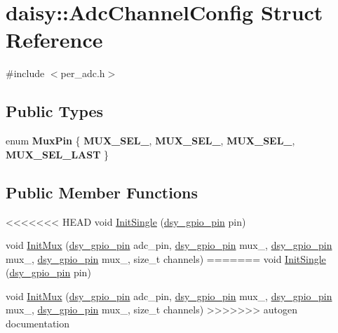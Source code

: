 \hypertarget{structdaisy_1_1_adc_channel_config}{}\section{daisy\+:\+:Adc\+Channel\+Config Struct Reference}
\label{structdaisy_1_1_adc_channel_config}


{\ttfamily \#include $<$per\+\_\+adc.\+h$>$}

\subsection*{Public Types}
\begin{DoxyCompactItemize}
\item 
\mbox{\label{structdaisy_1_1_adc_channel_config_af601e66da7eb60721792861fc91f2c83}} 
enum {\bfseries Mux\+Pin} \{ {\bfseries M\+U\+X\+\_\+\+S\+E\+L\+\_}, 
{\bfseries M\+U\+X\+\_\+\+S\+E\+L\+\_}, 
{\bfseries M\+U\+X\+\_\+\+S\+E\+L\+\_}, 
{\bfseries M\+U\+X\+\_\+\+S\+E\+L\+\_\+\+L\+A\+ST}
 \}
\end{DoxyCompactItemize}
\subsection*{Public Member Functions}
\begin{DoxyCompactItemize}
\item 
<<<<<<< HEAD
void \hyperlink{structdaisy_1_1_adc_channel_config_a53cd44a415eef197bc2f575f91d6d6af}{Init\+Single} (\hyperlink{structdsy__gpio__pin}{dsy\+\_\+gpio\+\_\+pin} pin)
\item 
void \hyperlink{structdaisy_1_1_adc_channel_config_a03a0b5bae339d3479e6b3d635d293c61}{Init\+Mux} (\hyperlink{structdsy__gpio__pin}{dsy\+\_\+gpio\+\_\+pin} adc\+\_\+pin, \hyperlink{structdsy__gpio__pin}{dsy\+\_\+gpio\+\_\+pin} mux\+\_, \hyperlink{structdsy__gpio__pin}{dsy\+\_\+gpio\+\_\+pin} mux\+\_, \hyperlink{structdsy__gpio__pin}{dsy\+\_\+gpio\+\_\+pin} mux\+\_, size\+\_\+t channels)
=======
void \hyperlink{structdaisy_1_1_adc_channel_config_a51189aad7fdee93523dfbcd333b681bf}{Init\+Single} (\hyperlink{structdsy__gpio__pin}{dsy\+\_\+gpio\+\_\+pin} pin)
\item 
void \hyperlink{structdaisy_1_1_adc_channel_config_ae825cc35459653136ccbf07d09c18fb9}{Init\+Mux} (\hyperlink{structdsy__gpio__pin}{dsy\+\_\+gpio\+\_\+pin} adc\+\_\+pin, \hyperlink{structdsy__gpio__pin}{dsy\+\_\+gpio\+\_\+pin} mux\+\_, \hyperlink{structdsy__gpio__pin}{dsy\+\_\+gpio\+\_\+pin} mux\+\_, \hyperlink{structdsy__gpio__pin}{dsy\+\_\+gpio\+\_\+pin} mux\+\_, size\+\_\+t channels)
>>>>>>> autogen documentation
\end{DoxyCompactItemize}
